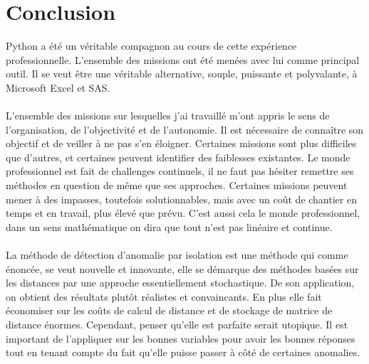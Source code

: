 \chapter*{Conclusion}

Python a été un véritable compagnon au cours de cette expérience professionnelle. L'ensemble des missions ont été menées avec lui comme principal outil. Il se veut être une véritable alternative, souple, puissante et polyvalante, à Microsoft Excel et SAS.
\\
\\
L'ensemble des missions sur lesquelles j'ai travaillé m'ont appris le sens de l'organisation, de l'objectivité et de l'autonomie. Il est nécessaire de connaître son objectif et de veiller à ne pas s'en éloigner. Certaines missions sont plus difficiles que d'autres, et certaines peuvent identifier des faiblesses existantes. Le monde professionnel est fait de challenges continuels, il ne faut pas hésiter remettre ses méthodes en question de même que ses approches. Certaines missions peuvent mener à des impasses, toutefois solutionnables, mais avec un coût de chantier en temps et en travail, plus élevé que prévu. C'est aussi cela le monde professionnel, dans un sens mathématique on dira que tout n'est pas linéaire et continue.
\\
\\
La méthode de détection d'anomalie par isolation est une méthode qui comme énoncée, se veut nouvelle et innovante, elle se démarque des méthodes basées sur les distances par une approche essentiellement stochastique. De son application, on obtient des résultats plutôt réalistes et convaincants. En plus elle fait économiser sur les coûts de calcul de distance et de stockage de matrice de distance énormes. Cependant, penser qu'elle est parfaite serait utopique. Il est important de l'appliquer sur les bonnes variables pour avoir les bonnes réponses tout en tenant compte du fait qu'elle puisse passer à côté de certaines anomalies.